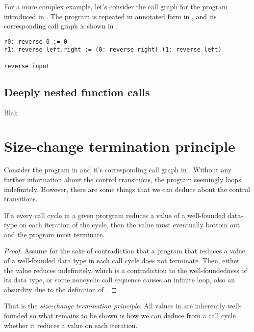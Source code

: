 For a more complex example, let's consider the call graph for the program
 introduced in . The program is
repeated in annotated form in , and its
corresponding call graph is shown in .

\begin{lstlisting}[label=listing:cfg-reverse,caption={An annotated version of the program \mono{reverse} introduced in \referToSection{d-samples}.}]
r0: reverse 0 := 0
r1: reverse left.right := (0: reverse right).(1: reverse left)

reverse input
\end{lstlisting}

 

\subsection{Deeply nested function calls}

Blah

\section{Size-change termination principle}

Consider the program in  and it's corresponding call
graph in . Without any further information about the
control transitions, the program seemingly loops indefinitely. However, there
are some things that we can deduce about the control transitions.

\begin{theorem}\label{theorem:size-change} If a every call cycle in a given
prorgram reduces a value of a well-founded data-type on each iteration of the
cycle, then the value must eventually bottom out and the program must
terminate\cite{size-change}.\end{theorem}

\begin{proof} Assume for the sake of contradiction that a program that reduces
a value of a well-founded data type in each call cycle does not terminate.
Then, either the value reduces indefinitely, which is a contradiction to the
well-foundedness of its data type, or some noncyclic call sequence causes an
infinite loop, also an absurdity due to the definition of \D{}. \end{proof}

That is the \emph{size-change termination principle}. All values in \D{} are
inherently well-founded so what remains to be shown is how we can deduce from a
call cycle whether it reduces a value on each iteration.

